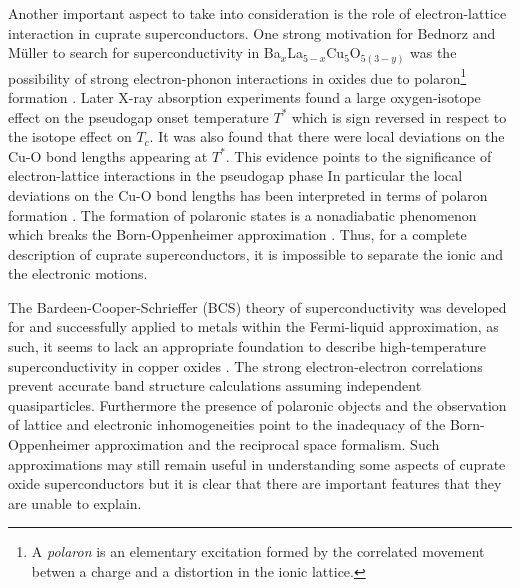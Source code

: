 Another important aspect to take into consideration is the role of electron-lattice interaction in cuprate superconductors.
One strong motivation for Bednorz and M\"{u}ller to search for superconductivity in Ba$_x$La$_{5-x}$Cu$_5$O$_{5(3-y)}$ was the possibility of strong electron-phonon interactions in oxides due to polaron\footnote{A \textit{polaron} is an elementary excitation formed by the correlated movement betwen a charge and a distortion in the ionic lattice.} formation \cite{Bednorz1986}.
Later X-ray absorption experiments found a large oxygen-isotope effect on the pseudogap onset temperature $T^*$ which is sign reversed in respect to the isotope effect on $T_c$.
It was also found that there were local deviations on the Cu-O bond lengths appearing at $T^*$.
This evidence points to the significance of electron-lattice interactions in the pseudogap phase
In particular the local deviations on the Cu-O bond lengths has been interpreted in terms of polaron formation \cite{MustredeLeon1992}.
The formation of polaronic states is a nonadiabatic phenomenon which breaks the Born-Oppenheimer approximation \cite{Born1927}.
Thus, for a complete description of cuprate superconductors, it is impossible to separate the ionic and the electronic motions.

The Bardeen-Cooper-Schrieffer (BCS) theory of superconductivity \cite{Bardeen1957} was developed for and successfully applied to metals within the Fermi-liquid approximation, as such, it seems to lack an appropriate foundation to describe high-temperature superconductivity in copper oxides \cite{Damascelli2003}.
The strong electron-electron correlations prevent accurate band structure calculations assuming independent quasiparticles.
Furthermore the presence of polaronic objects and the observation of lattice and electronic inhomogeneities point to the inadequacy of the Born-Oppenheimer approximation and the reciprocal space formalism.
Such approximations may still remain useful in understanding some aspects of cuprate oxide superconductors but it is clear that there are important features that they are unable to explain.

